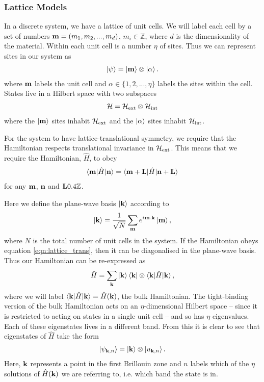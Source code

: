 \subsubsection{Lattice Models}\label{sec:lattice_bloch}
In a discrete system, we have a lattice of unit cells. We will label each cell by a set of numbers $\bf{m} = (m_1,m_2, ... , m_d)$, $m_i \in \mathbb{Z}$, where $d$ is the dimensionality of the material. Within each unit cell is a number $\eta$ of sites. Thus we can represent sites in our system as
\begin{align}
    \ket{\psi} = \ket{\bf m} \otimes \ket{\alpha}.
\end{align}
where $\bf m$ labels the unit cell and $\alpha \in \{1, 2 , ... , \eta\}$ labels the sites within the cell. States live in a Hilbert space with two subspaces
\begin{align}
    	\mathcal{H} = \mathcal{H}_{\textup{ext}} \otimes \mathcal{H}_{\textup{int}}
\end{align}
where the $\ket{\bf{m}}$ sites inhabit $\mathcal{H}_{\textup{ext}} $ and the $\ket{\alpha}$ sites inhabit $\mathcal{H}_{\textup{int}}$.\par
For the system to have lattice-translational symmetry, we require that the Hamiltonian respects translational invariance in $\mathcal{H}_{\textup{ext}}$. This means that we require the Hamiltonian, $\hat H$, to  obey
\begin{align}\label{eqn:lattice_trans}
    \braket{\bf m |\hat H| \bf n } = \braket{\bf m  + \bf L|\hat H| \bf n + \bf L}
\end{align}
for any $\bf m$, $\bf n $ and $\bf L \in \mathbb{Z} $.\par
Here we define the plane-wave basis $\ket {\bf k}$ according to
\begin{align}
	\ket{\bf k} = \frac{1}{\sqrt N} \sum_{\bf m} e^{i \bf m \cdot \bf k} \ket {\bf m},
\end{align}
where $N$ is the total number of unit cells in the system. If the Hamiltonian obeys equation \ref{eqn:lattice_trans}, then it can be diagonalised in the plane-wave basis. Thus our Hamiltonian can be re-expressed as
\begin{align}
	\hat H = \sum_{\bf k} \ket{\bf k} \bra{\bf k} \otimes \braket{\bf k | \hat H  | \bf k},
\end{align}
where we will label $\braket{\bf k |\hat  H  | \bf k}  = \hat H(\bf k)$, the bulk Hamiltonian. The tight-binding version of the bulk Hamiltonian acts on an $\eta$-dimensional Hilbert space -- since it is restricted to acting on states in a single unit cell -- and so has $\eta$ eigenvalues. Each of these eigenstates lives in a different band. From this it is clear to see that eigenstates of $\hat H$ take the form
\begin{align}
	\ket {\psi_{\bf k, n}} = \ket{\bf k} \otimes \ket{u_{\bf k, n}}.
\end{align}
Here, $\bf k$ represents a point in the first Brillouin zone and $n$ labels which of the $\eta$ solutions of $\hat H(\bf k)$ we are referring to, i.e. which band the state is in.

